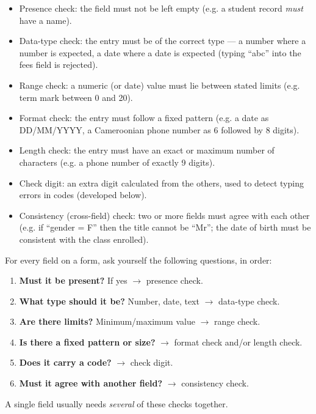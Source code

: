\documentclass[11pt]{article}
\newcommand{\cle}[1]{{\popxbold\color{popdark}#1}}
\begin{document}
\begin{definition}
\begin{itemize}
\item \cle{Presence check}: the field must not be left empty (e.g. a student record \emph{must} have a name).
\item \cle{Data-type check}: the entry must be of the correct type — a number where a number is expected, a date where a date is expected (typing ``abc'' into the fees field is rejected).
\item \cle{Range check}: a numeric (or date) value must lie between stated limits (e.g. term mark between 0 and 20).
\item \cle{Format check}: the entry must follow a fixed pattern (e.g. a date as DD/MM/YYYY, a Cameroonian phone number as 6 followed by 8 digits).
\item \cle{Length check}: the entry must have an exact or maximum number of characters (e.g. a phone number of exactly 9 digits).
\item \cle{Check digit}: an extra digit calculated from the others, used to detect typing errors in codes (developed below).
\item \cle{Consistency (cross-field) check}: two or more fields must agree with each other (e.g. if ``gender = F'' then the title cannot be ``Mr''; the date of birth must be consistent with the class enrolled).
\end{itemize}
\end{definition}

\begin{methode}
For every field on a form, ask yourself the following questions, in order:
\begin{enumerate}
\item \textbf{Must it be present?} If yes $\rightarrow$ presence check.
\item \textbf{What type should it be?} Number, date, text $\rightarrow$ data-type check.
\item \textbf{Are there limits?} Minimum/maximum value $\rightarrow$ range check.
\item \textbf{Is there a fixed pattern or size?} $\rightarrow$ format check and/or length check.
\item \textbf{Does it carry a code?} $\rightarrow$ check digit.
\item \textbf{Must it agree with another field?} $\rightarrow$ consistency check.
\end{enumerate}
A single field usually needs \emph{several} of these checks together.
\end{methode}
\end{document}
